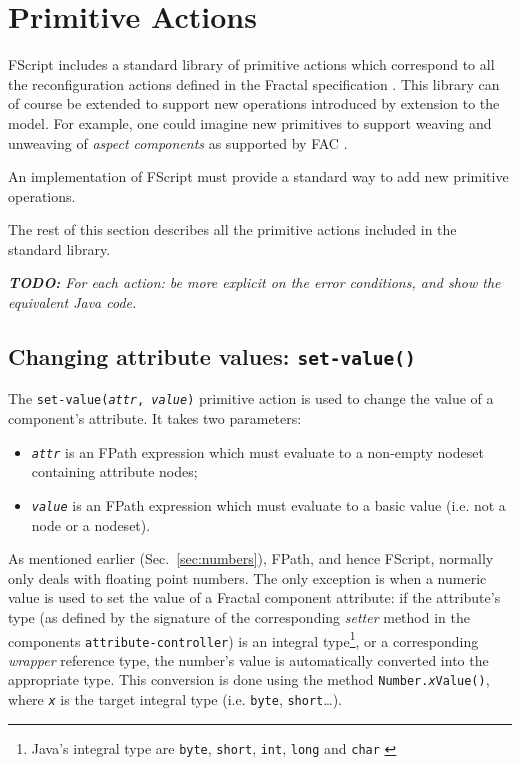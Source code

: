 \documentclass[a4paper,12pt]{report}
\newcommand{\todo}[1]{\textit{\textbf{TODO:} #1}}
\begin{document}
\section{Primitive Actions}
\label{sec:primitive-actions}

FScript includes a standard library of primitive actions which correspond to all the
reconfiguration actions defined in the Fractal specification
\citep{bruneton-coupaye-stefani.ow2003}. This library can of course be extended to support
new operations introduced by extension to the model. For example, one could imagine new
primitives to support weaving and unweaving of \emph{aspect components} as supported by
FAC \citep{pessemier-seinturier-duchien-barais.jfdlpa2004}.

An implementation of FScript must provide a standard way to add new primitive operations.

The rest of this section describes all the primitive actions included in the standard
library.%

\todo{For each action: be more explicit on the error conditions, and show the equivalent
  Java code.}

\subsection{Changing attribute values: \texttt{set-value()}}
\label{sec:action:set-value}

The \texttt{set-value(\textsl{attr}, \textsl{value})} primitive action is used to change
the value of a component's attribute. It takes two parameters:
\begin{itemize}
\item \texttt{\textsl{attr}} is an FPath expression which must evaluate to a non-empty
  nodeset containing attribute nodes;
\item \texttt{\textsl{value}} is an FPath expression which must evaluate to a basic value
  (i.e. not a node or a nodeset).
\end{itemize}

As mentioned earlier (Sec.~\ref{sec:numbers}), FPath, and hence FScript, normally only
deals with floating point numbers. The only exception is when a numeric value is used to
set the value of a Fractal component attribute: if the attribute's type (as defined by the
signature of the corresponding \emph{setter} method in the components
\texttt{attribute-controller}) is an integral type\footnote{Java's integral type are
  \texttt{byte}, \texttt{short}, \texttt{int}, \texttt{long} and \texttt{char}
  \citep[Sect.~4.2.2, p.~36]{gosling-joy-steele-bracha.book2005}}, or a corresponding
\emph{wrapper} reference type, the number's value is automatically converted into the
appropriate type. This conversion is done using the method
\texttt{Number.\textit{x}Value()}, where \texttt{\textit{x}} is the target integral type
(i.e. \texttt{byte}, \texttt{short}\dots).
\end{document}
